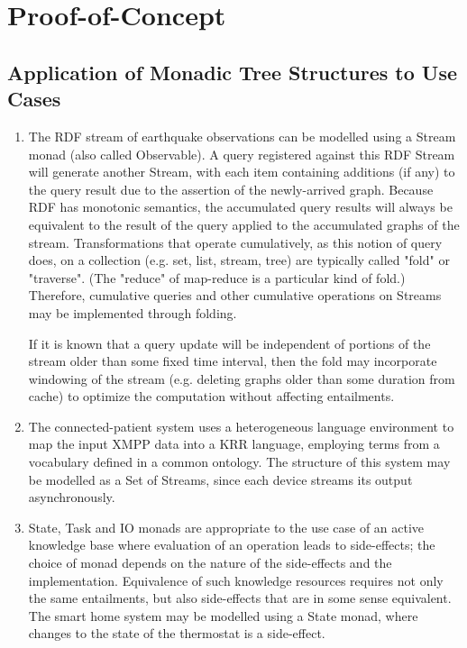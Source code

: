 \documentclass[runningheads]{llncs}
\begin{document}
\section{Proof-of-Concept}

\subsection{Application of Monadic Tree Structures to Use Cases}
\begin{enumerate}
\item The RDF stream of earthquake observations can be modelled using a Stream monad (also called Observable).
A query registered against this RDF Stream will generate another Stream, with each item containing additions (if any) to the query result due to the assertion of the newly-arrived graph.
Because RDF has monotonic semantics, the accumulated query results will always be equivalent to the result of the query applied to the accumulated graphs of the stream.
Transformations that operate cumulatively, as this notion of query does, on a collection (e.g. set, list, stream, tree) are typically called "fold" or "traverse". (The "reduce" of map-reduce is a particular kind of fold.)
Therefore, cumulative queries and other cumulative operations on Streams may be implemented through folding.

If it is known that a query update will be independent of portions of the stream older than some fixed time interval, then
the fold may incorporate windowing of the stream (e.g. deleting graphs older than some duration from cache) to optimize the computation without affecting entailments.

\item The connected-patient system uses a heterogeneous language environment to map the input XMPP data into a KRR language, employing terms from a vocabulary defined in a common ontology. The structure of this system may be modelled as a Set of Streams, since each device streams its output asynchronously.

\item State, Task and IO monads are appropriate to the use case of an active knowledge base where evaluation of an operation leads to side-effects; the choice of monad depends on the nature of the side-effects and the implementation.
Equivalence of such knowledge resources requires not only the same entailments, but also side-effects that are in some sense equivalent.
The smart home system may be modelled using a State monad, where changes to the state of the thermostat is a side-effect.


\end{enumerate}
\end{document}
